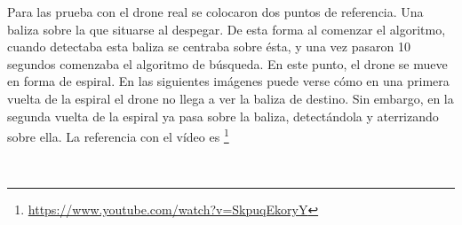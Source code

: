 \hspace{1cm} Para las prueba con el drone real se colocaron dos puntos de referencia. Una baliza sobre la que situarse al despegar. De esta forma al comenzar el algoritmo, cuando detectaba esta baliza se centraba sobre \'esta, y una vez pasaron 10 segundos comenzaba el algoritmo de b\'usqueda. En este punto, el drone se mueve en forma de espiral. En las siguientes im\'agenes puede verse c\'omo en una primera vuelta de la espiral el drone no llega a ver la baliza de destino. Sin embargo, en la segunda vuelta de la espiral ya pasa sobre la baliza, detect\'andola y aterrizando sobre ella. La referencia con el v\'ideo es \footnote{\url{https://www.youtube.com/watch?v=SkpuqEkoryY}}



\begin{figure}[H]
 \centering
  \\

\end{figure}
